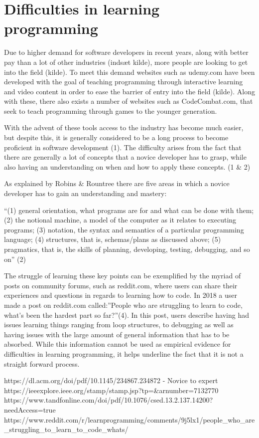 \chapter{Difficulties in learning programming}


Due to higher demand for software developers in recent years, along with better pay than a lot of other industries (indsæt kilde), more people are looking to get into the field (kilde). 
To meet this demand websites such as udemy.com have been developed with the goal of teaching programming through interactive learning and video content in order to ease the barrier of entry into the field (kilde).  
Along with these, there also exists a number of websites such as CodeCombat.com, that seek to teach programming through games to the younger generation. 

With the advent of these tools access to the industry has become much easier, but despite this, it is generally considered to be a long process to become proficient in software development (1). 
The difficulty arises from the fact that there are generally a lot of concepts that a novice developer has to grasp, while also having an understanding on when and how to apply these concepts. (1 & 2)

As explained by Robins & Rountree there are five areas in which a novice developer has to gain an understanding and mastery:

“(1) general orientation, what programs are for and what can be done with them; 
(2) the notional machine, a model of the computer as it relates to executing programs; 
(3) notation, the syntax and semantics of a particular programming language; 
(4) structures, that is, schemas/plans as discussed above; 
(5) pragmatics, that is, the skills of planning, developing, testing, debugging, and so on”
(2)

The struggle of learning these key points can be exemplified by the myriad of posts on community forums, such as reddit.com, where users can share their experiences and questions in regards to learning how to code.
In 2018 a user made a post on reddit.com called:”People who are struggling to learn to code, what's been the hardest part so far?”(4). 
In this post, users describe having had issues learning things ranging from loop structures, to debugging as well as having issues with the large amount of general information that has to be absorbed. 
While this information cannot be used as empirical evidence for difficulties in learning programming, it helps underline the fact that it is not a straight forward process. 




https://dl.acm.org/doi/pdf/10.1145/234867.234872 - Novice to expert
https://ieeexplore.ieee.org/stamp/stamp.jsp?tp=&arnumber=7132770
https://www.tandfonline.com/doi/pdf/10.1076/csed.13.2.137.14200?needAccess=true
https://www.reddit.com/r/learnprogramming/comments/9j5lx1/people_who_are_struggling_to_learn_to_code_whats/
